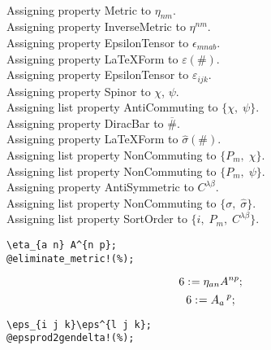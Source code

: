 \documentclass[11pt]{article}
\def\specialcolon{\mathrel{\mathop{:}}\hspace{-.5em}}
\renewcommand{\bar}[1]{\overline{#1}}
\begin{document}
\\
Assigning property Metric to ${\eta}_{n m}$.
\\
Assigning property InverseMetric to ${\eta}^{n m}$.
\\
Assigning property EpsilonTensor to ${\epsilon}_{m n a b}$.
\\
Assigning property LaTeXForm to $\varepsilon(\#)$.
\\
Assigning property EpsilonTensor to ${\varepsilon}_{i j k}$.
\\
Assigning property Spinor to $\chi$, $\psi$.
\\
Assigning list property AntiCommuting to $\{\chi,\; \psi\}$.
\\
Assigning property DiracBar to $\bar{\#}$.
\\
Assigning property LaTeXForm to $\hat{\sigma}(\#)$.
\\
Assigning list property NonCommuting to $\{{P}_{m},\; \chi\}$.
\\
Assigning list property NonCommuting to $\{{P}_{m},\; \psi\}$.
\\
Assigning property AntiSymmetric to ${C}^{\lambda \beta}$.
\\
Assigning list property NonCommuting to $\{\sigma,\; \hat{\sigma}\}$.
\\
Assigning list property SortOrder to $\{i,\; {P}_{m},\; {C}^{\lambda \beta}\}$.
\\
{\color[named]{Blue}\begin{verbatim}
\eta_{a n} A^{n p};
@eliminate_metric!(%);
\end{verbatim}}
\begin{dmath*}[compact, spread=2pt]
6\specialcolon{}= {\eta}_{a n} {A}^{n p};
\end{dmath*}
\begin{dmath*}[compact, spread=2pt]
6\specialcolon{}= {A}_{a}\,^{p};
\end{dmath*}
{\color[named]{Blue}\begin{verbatim}
\eps_{i j k}\eps^{l j k};
@epsprod2gendelta!(%);
\end{verbatim}}
\end{document}
